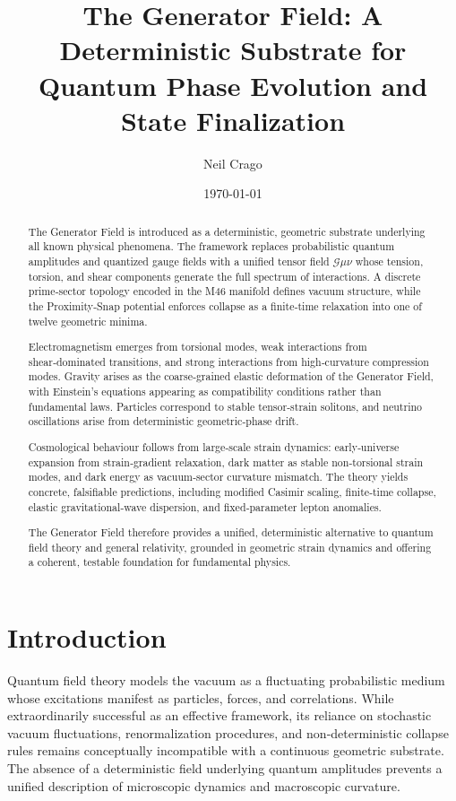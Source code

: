 \documentclass[reprint,amsmath,amssymb,aps,prl,floatfix]{revtex4-2}
\begin{document}
\title{The Generator Field: A Deterministic Substrate for Quantum Phase Evolution and State Finalization}

\author{Neil Crago}
\date{\today}

\begin{abstract}
The Generator Field is introduced as a deterministic, geometric substrate underlying all known physical phenomena. The framework replaces probabilistic quantum amplitudes and quantized gauge fields with a unified tensor field \(\mathcal{G}{\mu\nu}\) whose tension, torsion, and shear components generate the full spectrum of interactions. A discrete prime‑sector topology encoded in the M46 manifold defines vacuum structure, while the Proximity‑Snap potential enforces collapse as a finite‑time relaxation into one of twelve geometric minima.  
\medskip

Electromagnetism emerges from torsional modes, weak interactions from shear‑dominated transitions, and strong interactions from high‑curvature compression modes. Gravity arises as the coarse‑grained elastic deformation of the Generator Field, with Einstein’s equations appearing as compatibility conditions rather than fundamental laws. Particles correspond to stable tensor‑strain solitons, and neutrino oscillations arise from deterministic geometric‑phase drift.  
\medskip

Cosmological behaviour follows from large‑scale strain dynamics: early‑universe expansion from strain‑gradient relaxation, dark matter as stable non‑torsional strain modes, and dark energy as vacuum‑sector curvature mismatch. The theory yields concrete, falsifiable predictions, including modified Casimir scaling, finite‑time collapse, elastic gravitational‑wave dispersion, and fixed‑parameter lepton anomalies.  
\medskip

The Generator Field therefore provides a unified, deterministic alternative to quantum field theory and general relativity, grounded in geometric strain dynamics and offering a coherent, testable foundation for fundamental physics.
\end{abstract}

\maketitle

\section{Introduction}
Quantum field theory models the vacuum as a fluctuating probabilistic medium whose excitations manifest as particles, forces, and correlations. While extraordinarily successful as an effective framework, its reliance on stochastic vacuum fluctuations, renormalization procedures, and non‑deterministic collapse rules remains conceptually incompatible with a continuous geometric substrate. The absence of a deterministic field underlying quantum amplitudes prevents a unified description of microscopic dynamics and macroscopic curvature.
\medskip
\end{document}
